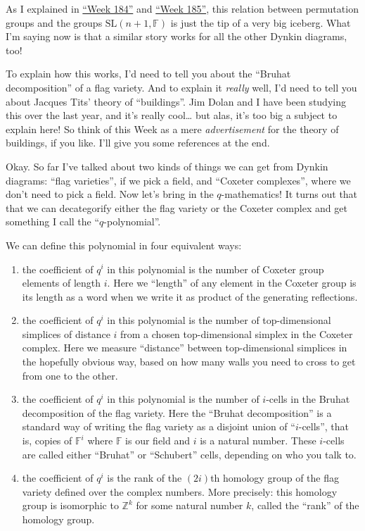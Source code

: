 \documentclass{article}
\begin{document}
As I explained in \protect\hyperlink{week184}{``Week 184''} and
\protect\hyperlink{week185}{``Week 185''}, this relation between
permutation groups and the groups \(\mathrm{SL}(n+1,\mathbb{F})\) is
just the tip of a very big iceberg. What I'm saying now is that a
similar story works for all the other Dynkin diagrams, too!

To explain how this works, I'd need to tell you about the ``Bruhat
decomposition'' of a flag variety. And to explain it \emph{really} well,
I'd need to tell you about Jacques Tits' theory of ``buildings''. Jim
Dolan and I have been studying this over the last year, and it's really
cool\ldots{} but alas, it's too big a subject to explain here! So think
of this Week as a mere \emph{advertisement} for the theory of buildings,
if you like. I'll give you some references at the end.

Okay. So far I've talked about two kinds of things we can get from
Dynkin diagrams: ``flag varieties'', if we pick a field, and ``Coxeter
complexes'', where we don't need to pick a field. Now let's bring in the
\(q\)-mathematics! It turns out that that we can decategorify either the
flag variety or the Coxeter complex and get something I call the
``\(q\)-polynomial''.

We can define this polynomial in four equivalent ways:

\begin{enumerate}
\def\labelenumi{\alph{enumi})}
\item
  the coefficient of \(q^i\) in this polynomial is the number of Coxeter
  group elements of length \(i\). Here we ``length'' of any element in
  the Coxeter group is its length as a word when we write it as product
  of the generating reflections.
\item
  the coefficient of \(q^i\) in this polynomial is the number of
  top-dimensional simplices of distance \(i\) from a chosen
  top-dimensional simplex in the Coxeter complex. Here we measure
  ``distance'' between top-dimensional simplices in the hopefully
  obvious way, based on how many walls you need to cross to get from one
  to the other.
\item
  the coefficient of \(q^i\) in this polynomial is the number of
  \(i\)-cells in the Bruhat decomposition of the flag variety. Here the
  ``Bruhat decomposition'' is a standard way of writing the flag variety
  as a disjoint union of ``\(i\)-cells'', that is, copies of
  \(\mathbb{F}^i\) where \(\mathbb{F}\) is our field and \(i\) is a
  natural number. These \(i\)-cells are called either ``Bruhat'' or
  ``Schubert'' cells, depending on who you talk to.
\item
  the coefficient of \(q^i\) is the rank of the \((2i)\)th homology
  group of the flag variety defined over the complex numbers. More
  precisely: this homology group is isomorphic to \(\mathbb{Z}^k\) for
  some natural number \(k\), called the ``rank'' of the homology group.
\end{enumerate}
\end{document}
